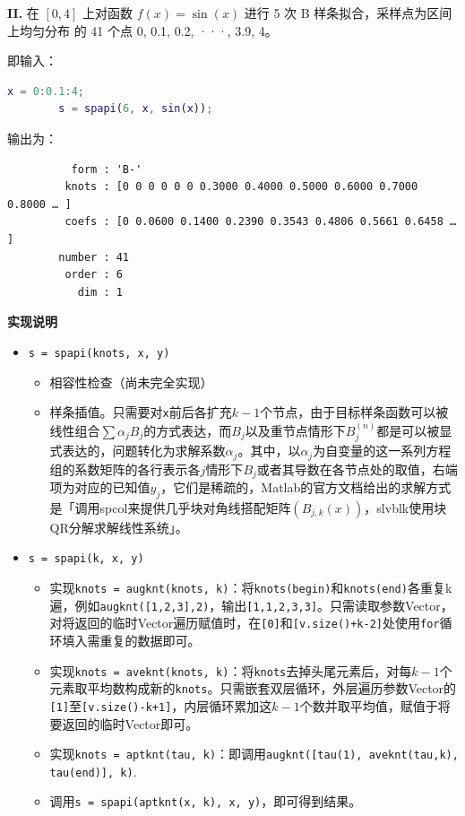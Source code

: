 \textbf{II.} 在 $[0, 4]$ 上对函数 $f(x) = \sin(x)$ 进行 5 次 B 样条拟合，采样点为区间上均匀分布 的 41 个点
0, 0.1, 0.2, ···, 3.9, 4。

即输入：
\begin{lstlisting}[language=matlab]
        x = 0:0.1:4;
        s = spapi(6, x, sin(x));
\end{lstlisting}

输出为：
\begin{lstlisting}
          form : 'B-'
         knots : [0 0 0 0 0 0 0.3000 0.4000 0.5000 0.6000 0.7000 0.8000 … ]
         coefs : [0 0.0600 0.1400 0.2390 0.3543 0.4806 0.5661 0.6458 … ]
        number : 41
         order : 6
           dim : 1
\end{lstlisting}

\textbf{实现说明}
\begin{itemize}
    \item \texttt{s = spapi(knots, x, y)}
    \begin{itemize}
        \item 相容性检查（尚未完全实现）
        \item 样条插值。只需要对\texttt{x}前后各扩充$k-1$个节点，由于目标样条函数可以被线性组合$\sum \alpha_j B_j$的方式表达，而$B_j$以及重节点情形下$B_j^{(n)}$都是可以被显式表达的，问题转化为求解系数$\alpha_j$。其中，以$\alpha_j$为自变量的这一系列方程组的系数矩阵的各行表示各$j$情形下$B_j$或者其导数在各节点处的取值，右端项为对应的已知值$y_j$，它们是稀疏的，Matlab的官方文档给出的求解方式是「调用spcol来提供几乎块对角线搭配矩阵$(B_{j,k}(x))$，slvblk使用块QR分解求解线性系统」。
    \end{itemize}
    \item \texttt{s = spapi(k, x, y)}
    \begin{itemize}
        \item 实现\texttt{knots = augknt(knots, k)}：将\texttt{knots(begin)}和\texttt{knots(end)}各重复k遍，例如\texttt{augknt([1,2,3],2)}，输出\texttt{[1,1,2,3,3]}。只需读取参数Vector，对将返回的临时Vector遍历赋值时，在\texttt{[0]}和\texttt{[v.size()+k-2]}处使用\texttt{for}循环填入需重复的数据即可。
        \item 实现\texttt{knots = aveknt(knots, k)}：将\texttt{knots}去掉头尾元素后，对每$k-1$个元素取平均数构成新的\texttt{knots}。只需嵌套双层循环，外层遍历参数Vector的\texttt{[1]}至\texttt{[v.size()-k+1]}，内层循环累加这$k-1$个数并取平均值，赋值于将要返回的临时Vector即可。
        \item 实现\texttt{knots = aptknt(tau, k)}：即调用\texttt{augknt([tau(1), aveknt(tau,k), tau(end)], k)}.
        \item 调用\texttt{s = spapi(aptknt(x, k), x, y)}，即可得到结果。
    \end{itemize}
\end{itemize}

